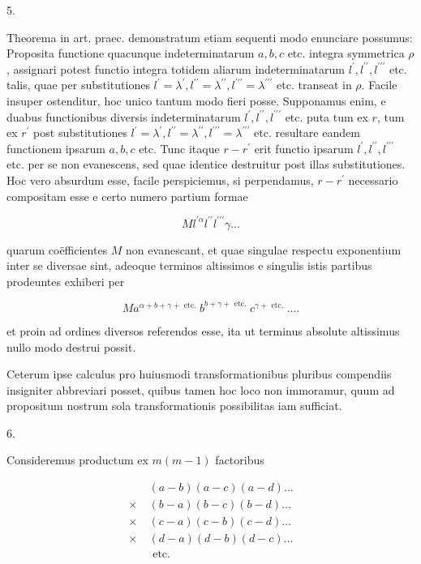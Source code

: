 \documentclass[twoside,12pt, showframe]{memoir}
\begin{document}
5.

Theorema in art. praec. demonstratum etiam sequenti modo enunciare possumus: Proposita functione quacunque indeterminatarum \(a, b, c\) etc. integra symmetrica \(\rho\), assignari potest functio integra totidem aliarum indeterminatarum \(l^{\prime}, l^{\prime \prime}, l^{\prime \prime \prime}\) etc. talis, quae per substitutiones \(l^{\prime}=\lambda^{\prime}, l^{\prime \prime}=\lambda^{\prime \prime}, l^{\prime \prime \prime}=\lambda^{\prime \prime \prime}\) etc. transeat
in \(\rho\). Facile insuper ostenditur, hoc unico tantum modo fieri posse. Supponamus enim, e duabus functionibus diversis indeterminatarum \(l^{\prime}, l^{\prime \prime}, l^{\prime \prime \prime}\) etc. puta tum ex \(r\), tum ex \(r^{\prime}\) post substitutiones \(l^{\prime}=\lambda^{\prime}, l^{\prime \prime}=\lambda^{\prime \prime}, l^{\prime \prime \prime}=\lambda^{\prime \prime \prime}\) etc. resultare eandem functionem ipsarum \(a, b, c\) etc. Tunc itaque \(r-r^{\prime}\) erit functio ipsarum \(l^{\prime}, l^{\prime \prime}, l^{\prime \prime \prime}\) etc. per se non evanescens, sed quae identice destruitur post illas substitutiones. Hoc vero absurdum esse, facile perspiciemus, si perpendamus, \(r-r^{\prime}\) necessario compositam esse e certo numero partium formae

\[
M l^{\prime \alpha} l^{\prime \prime} l^{\prime \prime \prime} \gamma \ldots
\]

quarum coëfficientes \(M\) non evanescant, et quae singulae respectu exponentium inter se diversae sint, adeoque terminos altissimos e singulis istis partibus prodeuntes exhiberi per

\[
M a^{\alpha+b+\gamma+\text { etc. }} b^{b+\gamma+\text { etc. }} c^{\gamma+\text { etc. }} . . . .
\]

et proin ad ordines diversos referendos esse, ita ut terminus absolute altissimus nullo modo destrui possit.

Ceterum ipse calculus pro huiusmodi transformationibus pluribus compendiis insigniter abbreviari posset, quibus tamen hoc loco non immoramur, quum ad propositum nostrum sola transformationis possibilitas iam sufficiat.

6.

Consideremus productum ex \(m(m-1)\) factoribus

\[
\begin{aligned}
& (a-b)(a-c)(a-d) \ldots \\
\times & (b-a)(b-c)(b-d) \ldots \\
\times & (c-a)(c-b)(c-d) \ldots \\
\times & (d-a)(d-b)(d-c) \ldots \\
\quad & \text { etc. }
\end{aligned}
\]
\end{document}
